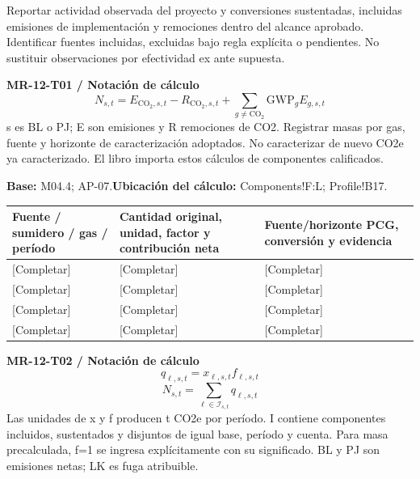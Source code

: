 Reportar actividad observada del proyecto y conversiones sustentadas, incluidas emisiones de implementación y remociones dentro del alcance aprobado. Identificar fuentes incluidas, excluidas bajo regla explícita o pendientes. No sustituir observaciones por efectividad ex ante supuesta.\par
{}
\par\begingroup\sffamily\fontsize{8.4}{10.5}\selectfont\color{NEBGreen}
\textbf{MR-12-T01 / Notación de cálculo}\
{\fontsize{10}{12}\selectfont\[N_{s,t}=E_{\mathrm{CO_2},s,t}-R_{\mathrm{CO_2},s,t}+\sum_{g\ne\mathrm{CO_2}}\mathrm{GWP}_gE_{g,s,t}\]}
s es BL o PJ; E son emisiones y R remociones de CO2. Registrar masas por gas, fuente y horizonte de caracterización adoptados. No caracterizar de nuevo CO2e ya caracterizado. El libro importa estos cálculos de componentes calificados.\par
\textbf{Base:} M04.4; AP-07.\quad\textbf{Ubicación del cálculo:} Components!F:L; Profile!B17.\par\endgroup
{\sffamily\fontsize{8.6}{10.7}\selectfont\begin{longtable}{@{}P{48mm}P{61mm}P{53mm}@{}}
\toprule
\textbf{Fuente / sumidero / gas / período} & \textbf{Cantidad original, unidad, factor y contribución neta} & \textbf{Fuente/horizonte PCG, conversión y evidencia}\\\midrule\endhead
\rule{0pt}{8mm}[Completar] & [Completar] & [Completar]\\\hline
\rule{0pt}{8mm}[Completar] & [Completar] & [Completar]\\\hline
\rule{0pt}{8mm}[Completar] & [Completar] & [Completar]\\\hline
\rule{0pt}{8mm}[Completar] & [Completar] & [Completar]\\\hline
\end{longtable}}
\par\begingroup\sffamily\fontsize{8.4}{10.5}\selectfont\color{NEBGreen}
\textbf{MR-12-T02 / Notación de cálculo}\
{\fontsize{10}{12}\selectfont\[q_{\ell,s,t}=x_{\ell,s,t}f_{\ell,s,t}\]}
{\fontsize{10}{12}\selectfont\[N_{s,t}=\sum_{\ell\in\mathcal I_{s,t}}q_{\ell,s,t}\]}
Las unidades de x y f producen t CO2e por período. I contiene componentes incluidos, sustentados y disjuntos de igual base, período y cuenta. Para masa precalculada, f=1 se ingresa explícitamente con su significado. BL y PJ son emisiones netas; LK es fuga atribuible.\par
